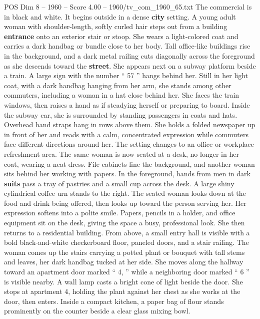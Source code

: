 \begin{textsample}{POS Dim 8 – 1960 – Score 4.00 – 1960/tv\_com\_1960\_65.txt}  \label{ex:f8_pos_090}
The commercial is in black and white.
It begins outside in a dense \textbf{city} setting.
A young adult woman with shoulder-length, softly curled hair steps out from a building \textbf{entrance} onto an exterior stair or stoop.
She wears a light-colored coat and carries a dark handbag or bundle close to her body.
Tall office-like buildings rise in the background, and a dark metal railing cuts diagonally across the foreground as she descends toward the \textbf{street}.
She appears next on a subway platform beside a train.
A large sign with the number “ 57 ” hangs behind her.
Still in her light coat, with a dark handbag hanging from her arm, she stands among other commuters, including a woman in a hat close behind her.
She faces the train windows, then raises a hand as if steadying herself or preparing to board.
Inside the subway car, she is surrounded by standing passengers in coats and hats.
Overhead hand straps hang in rows above them.
She holds a folded newspaper up in front of her and reads with a calm, concentrated expression while commuters face different directions around her.
The setting changes to an office or workplace refreshment area.
The same woman is now seated at a desk, no longer in her coat, wearing a neat dress.
File cabinets line the background, and another woman sits behind her working with papers.
In the foreground, hands from men in dark \textbf{suits} pass a tray of pastries and a small cup across the desk.
A large shiny cylindrical coffee urn stands to the right.
The seated woman looks down at the food and drink being offered, then looks up toward the person serving her.
Her expression softens into a polite smile.
Papers, pencils in a holder, and office equipment sit on the desk, giving the space a busy, professional look.
She then returns to a residential building.
From above, a small entry hall is visible with a bold black-and-white checkerboard floor, paneled doors, and a stair railing.
The woman comes up the stairs carrying a potted plant or bouquet with tall stems and leaves, her dark handbag tucked at her side.
She moves along the hallway toward an apartment door marked “ 4, ” while a neighboring door marked “ 6 ” is visible nearby.
A wall lamp casts a bright cone of light beside the door.
She stops at apartment 4, holding the plant against her chest as she works at the door, then enters.
Inside a compact kitchen, a paper bag of flour stands prominently on the counter beside a clear glass mixing bowl.

\end{textsample}
